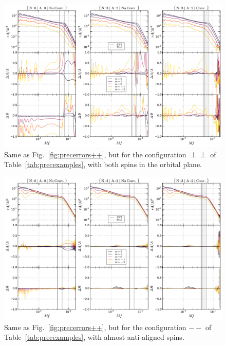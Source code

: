 \documentclass[aps,showpacs,twocolumn,
prd,superscriptaddress,nofootinbib]{revtex4-1}
\begin{document}
\begin{figure}
  \centering
  \includegraphics[width=.98\linewidth]{plots/precerror_pp_py.pdf}
  \caption{Same as Fig.~\ref{fig:precerrors++}, but for the configuration $\perp\perp$ of Table~\ref{tab:precexamples}, with both spins in the orbital plane.}
  \label{fig:precerrorspp}
\end{figure}

\begin{figure}
  \centering
  \includegraphics[width=.98\linewidth]{plots/precerror_--_py.pdf}
  \caption{Same as Fig.~\ref{fig:precerrors++}, but for the configuration $--$ of Table~\ref{tab:precexamples}, with almost anti-aligned spins.}
  \label{fig:precerrors--}
\end{figure}
\end{document}
